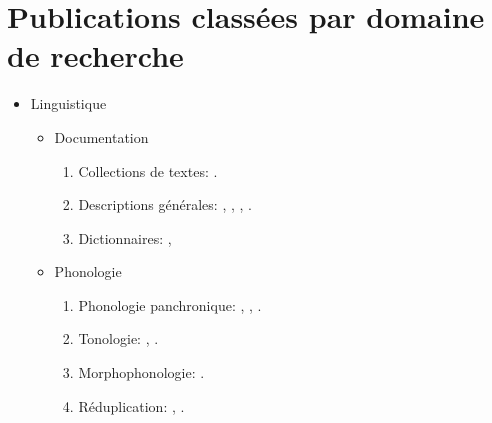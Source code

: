 \documentclass[oneside,a4paper,11pt]{article}
\newcommand{\langue}[2]{#2}
\begin{document}
\section{\langue{By topics}{Publications classées par domaine de recherche}}
\begin{itemize}
\item  \langue{Linguistics}{Linguistique} 
\begin{itemize}
\item  Documentation
\begin{enumerate}
\item  \langue{Text collections}{Collections de textes}: \citet{jacques10gesar}.
\item \langue{General descriptions}{Descriptions générales}: \citet{jacques04these}, \citet{jacques08}, \citet{jacques17sketch}, \citet{jacques17stau}.
\item \langue{Dictionaries}{Dictionnaires}: \citet{jacques15japhug}, \citet{jacques15khaling}
\end{enumerate}


\item \langue{Phonology}{Phonologie}
\begin{enumerate}
\item  \langue{Panchronic Phonology}{Phonologie panchronique}:  \citet{jacques11lingua}, \citet{michaud-jacques12nasalite},     \citet{jacques13arapaho}.
\item   \langue{Tonology}{Tonologie}: \citet{jacques11pumi.tone}, \citet{jacques16tonogenesis}.
\item \langue{Morphophonology}{Morphophonologie}: \citet{jacques12khaling}.
\item \langue{Reduplication}{Réduplication}:  \citet{jacques04redupl},  \citet{jacques07redupl}.
\end{enumerate}


\end{itemize}
\end{itemize}
\end{document}
